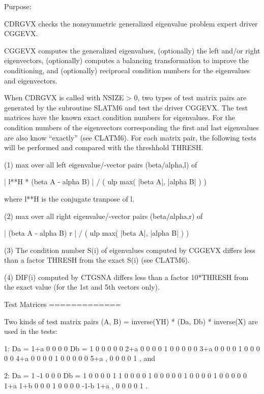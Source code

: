 \begin{DoxyParagraph}{Purpose\+: }
\begin{DoxyVerb} CDRGVX checks the nonsymmetric generalized eigenvalue problem
 expert driver CGGEVX.

 CGGEVX computes the generalized eigenvalues, (optionally) the left
 and/or right eigenvectors, (optionally) computes a balancing
 transformation to improve the conditioning, and (optionally)
 reciprocal condition numbers for the eigenvalues and eigenvectors.

 When CDRGVX is called with NSIZE > 0, two types of test matrix pairs
 are generated by the subroutine SLATM6 and test the driver CGGEVX.
 The test matrices have the known exact condition numbers for
 eigenvalues. For the condition numbers of the eigenvectors
 corresponding the first and last eigenvalues are also know
 ``exactly'' (see CLATM6).
 For each matrix pair, the following tests will be performed and
 compared with the threshhold THRESH.

 (1) max over all left eigenvalue/-vector pairs (beta/alpha,l) of

    | l**H * (beta A - alpha B) | / ( ulp max( |beta A|, |alpha B| ) )

     where l**H is the conjugate tranpose of l.

 (2) max over all right eigenvalue/-vector pairs (beta/alpha,r) of

       | (beta A - alpha B) r | / ( ulp max( |beta A|, |alpha B| ) )

 (3) The condition number S(i) of eigenvalues computed by CGGEVX
     differs less than a factor THRESH from the exact S(i) (see
     CLATM6).

 (4) DIF(i) computed by CTGSNA differs less than a factor 10*THRESH
     from the exact value (for the 1st and 5th vectors only).

 Test Matrices
 =============

 Two kinds of test matrix pairs
          (A, B) = inverse(YH) * (Da, Db) * inverse(X)
 are used in the tests:

 1: Da = 1+a   0    0    0    0    Db = 1   0   0   0   0
          0   2+a   0    0    0         0   1   0   0   0
          0    0   3+a   0    0         0   0   1   0   0
          0    0    0   4+a   0         0   0   0   1   0
          0    0    0    0   5+a ,      0   0   0   0   1 , and

 2: Da =  1   -1    0    0    0    Db = 1   0   0   0   0
          1    1    0    0    0         0   1   0   0   0
          0    0    1    0    0         0   0   1   0   0
          0    0    0   1+a  1+b        0   0   0   1   0
          0    0    0  -1-b  1+a ,      0   0   0   0   1 .


\end{DoxyVerb}
\end{DoxyParagraph}
